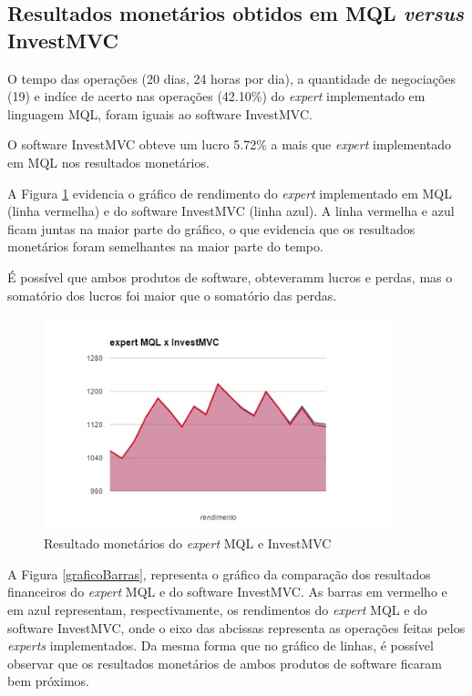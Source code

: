 \subsection{Resultados monetários obtidos em MQL \textit{versus} InvestMVC}
O tempo das operações (20 dias, 24 horas por dia), a quantidade de negociações (19) e indíce de acerto nas operações (42.10\%) do \textit{expert} implementado em linguagem MQL, foram iguais ao software InvestMVC.

O software InvestMVC obteve um lucro 5.72\% a mais que \textit{expert} implementado em MQL nos resultados monetários. 

A Figura \ref{rendimentoVersus} evidencia o gráfico de rendimento do \textit{expert} implementado em MQL (linha vermelha) e do software InvestMVC (linha azul). A linha vermelha e azul ficam juntas na maior parte do gráfico, o que evidencia que os resultados monetários foram semelhantes na maior parte do tempo.

É possível que ambos produtos de software, obteveramm lucros e perdas, mas o somatório dos lucros foi maior que o somatório das perdas.

\begin{figure}[H]
\centering
\includegraphics[width=0.9\textwidth]{figuras/rendimentoVersus}
\caption{Resultado monetários do \textit{expert} MQL e InvestMVC}
\label{rendimentoVersus}
\end{figure}

A Figura \ref{graficoBarras}, representa o gráfico da comparação dos resultados financeiros do \textit{expert} MQL e do software InvestMVC. As barras em vermelho e em azul representam, respectivamente, os rendimentos do \textit{expert} MQL e do software InvestMVC, onde o eixo das abcissas representa as operações feitas pelos  \textit{experts} implementados. Da mesma forma que no gráfico de linhas, é possível observar que os resultados monetários de ambos produtos de software ficaram bem próximos.


